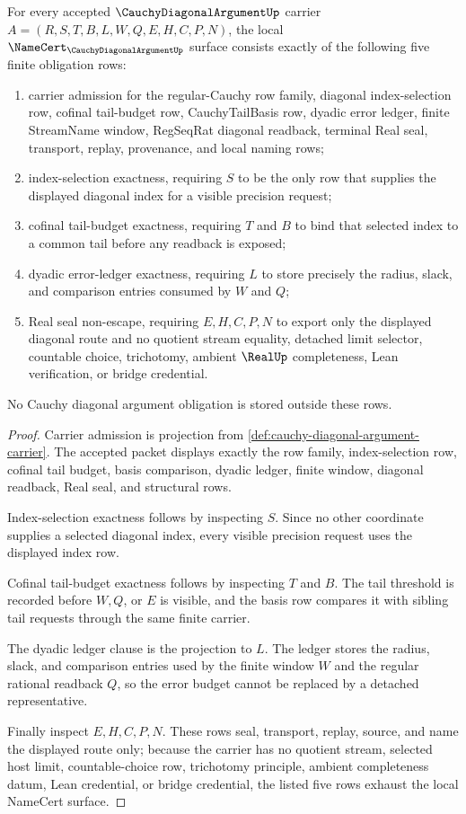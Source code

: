 \begin{theorem}
\label{thm:cauchy-diagonal-argument-namecert-obligations}
For every accepted $\CauchyDiagonalArgumentUp$ carrier $A=(R,S,T,B,L,W,Q,E,H,C,P,N)$, the local $\NameCert_{\CauchyDiagonalArgumentUp}$ surface consists exactly of the following five finite obligation rows:
\begin{enumerate}
\item carrier admission for the regular-Cauchy row family, diagonal index-selection row, cofinal tail-budget row, CauchyTailBasis row, dyadic error ledger, finite StreamName window, RegSeqRat diagonal readback, terminal Real seal, transport, replay, provenance, and local naming rows;
\item index-selection exactness, requiring $S$ to be the only row that supplies the displayed diagonal index for a visible precision request;
\item cofinal tail-budget exactness, requiring $T$ and $B$ to bind that selected index to a common tail before any readback is exposed;
\item dyadic error-ledger exactness, requiring $L$ to store precisely the radius, slack, and comparison entries consumed by $W$ and $Q$;
\item Real seal non-escape, requiring $E,H,C,P,N$ to export only the displayed diagonal route and no quotient stream equality, detached limit selector, countable choice, trichotomy, ambient $\RealUp$ completeness, Lean verification, or bridge credential.
\end{enumerate}
No Cauchy diagonal argument obligation is stored outside these rows.
\end{theorem}
\begin{proof}
Carrier admission is projection from \autoref{def:cauchy-diagonal-argument-carrier}. The accepted packet displays exactly the row family, index-selection row, cofinal tail budget, basis comparison, dyadic ledger, finite window, diagonal readback, Real seal, and structural rows.

Index-selection exactness follows by inspecting $S$. Since no other coordinate supplies a selected diagonal index, every visible precision request uses the displayed index row.

Cofinal tail-budget exactness follows by inspecting $T$ and $B$. The tail threshold is recorded before $W,Q$, or $E$ is visible, and the basis row compares it with sibling tail requests through the same finite carrier.

The dyadic ledger clause is the projection to $L$. The ledger stores the radius, slack, and comparison entries used by the finite window $W$ and the regular rational readback $Q$, so the error budget cannot be replaced by a detached representative.

Finally inspect $E,H,C,P,N$. These rows seal, transport, replay, source, and name the displayed route only; because the carrier has no quotient stream, selected host limit, countable-choice row, trichotomy principle, ambient completeness datum, Lean credential, or bridge credential, the listed five rows exhaust the local NameCert surface.
\end{proof}

